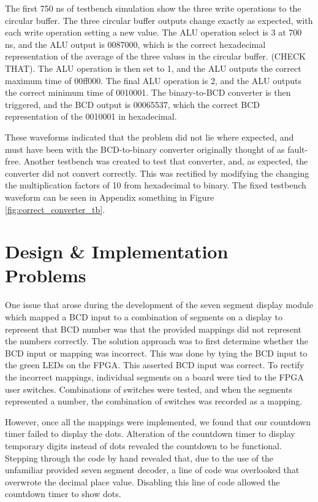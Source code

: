 \documentclass[11pt]{article}
\begin{document}
The first 750 ns of testbench simulation show the three write operations to the circular buffer. The three circular buffer outputs change exactly as expected, with each write operation setting a new value. The ALU operation select is 3 at 700 ns, and the ALU output is 0087000, which is the correct hexadecimal representation of the average of the three values in the circular buffer. (CHECK THAT). The ALU operation is then set to 1, and the ALU outputs the correct maximum time of 00ff000. The final ALU operation is 2, and the ALU outputs the correct minimum time of 0010001. The binary-to-BCD converter is then triggered, and the BCD output is 00065537, which the correct BCD representation of the 0010001 in hexadecimal.

These waveforms indicated that the problem did not lie where expected, and must have been with the BCD-to-binary converter originally thought of as fault-free. Another testbench was created to test that converter, and, as expected, the converter did not convert correctly. This was rectified by modifying the changing the multiplication factors of 10 from hexadecimal to binary. The fixed testbench waveform can be seen in Appendix something in Figure \ref{fig:correct_converter_tb}.

\newpage

\section{Design \& Implementation Problems}

One issue that arose during the development of the seven segment display module which mapped a BCD input to a combination of segments on a display to represent that BCD number was that the provided mappings did not represent the numbers correctly. The solution approach was to first determine whether the BCD input or mapping was incorrect. This was done by tying the BCD input to the green LEDs on the FPGA. This asserted BCD input was correct. To rectify the incorrect mappings, individual segments on a board were tied to the FPGA user switches. Combinations of switches were tested, and when the segments represented a number, the combination of switches was recorded as a mapping.

However, once all the mappings were implemented, we found that our countdown timer failed to display the dots. Alteration of the countdown timer to display temporary digits instead of dots revealed the countdown to be functional. Stepping through the code by hand revealed that, due to the use of the unfamiliar provided seven segment decoder, a line of code was overlooked that overwrote the decimal place value. Disabling this line of code allowed the countdown timer to show dots.
\end{document}
